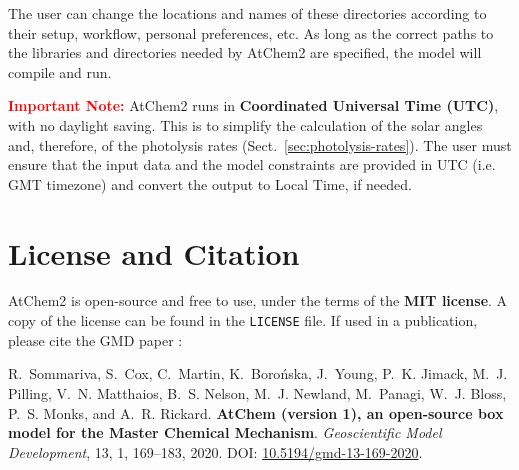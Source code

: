 The user can change the locations and names of these directories according to their setup,
workflow, personal preferences, etc. As long as the correct paths to the libraries and
directories needed by AtChem2 are specified, the model will compile and run.

\medskip \noindent
\textcolor{red}{\bf Important Note:} AtChem2 runs in \textbf{Coordinated Universal Time (UTC)},
with no daylight saving. This is to simplify the calculation of the solar angles and,
therefore, of the photolysis rates (Sect.~\ref{sec:photolysis-rates}). The user must ensure
that the input data and the model constraints are provided in UTC (i.e. GMT timezone) and
convert the output to Local Time, if needed.

\section{License and Citation} \label{sec:license-citation}

AtChem2 is open-source and free to use, under the terms of the \textbf{MIT license}. A copy of
the license can be found in the \texttt{LICENSE} file. If used in a publication, please cite
the GMD paper \citep{sommariva_2020}:

\medskip \noindent
R.~Sommariva, S.~Cox, C.~Martin, K.~Boro{\'n}ska, J.~Young, P.~K. Jimack, M.~J. Pilling,
V.~N. Matthaios, B.~S. Nelson, M.~J. Newland, M.~Panagi, W.~J. Bloss, P.~S. Monks, and
A.~R. Rickard. \textbf{AtChem (version 1), an open-source box model for the Master Chemical
  Mechanism}. \textit{Geoscientific Model Development}, 13, 1, 169--183, 2020. DOI:
\href{https://doi.org/10.5194/gmd-13-169-2020}{10.5194/gmd-13-169-2020}.
